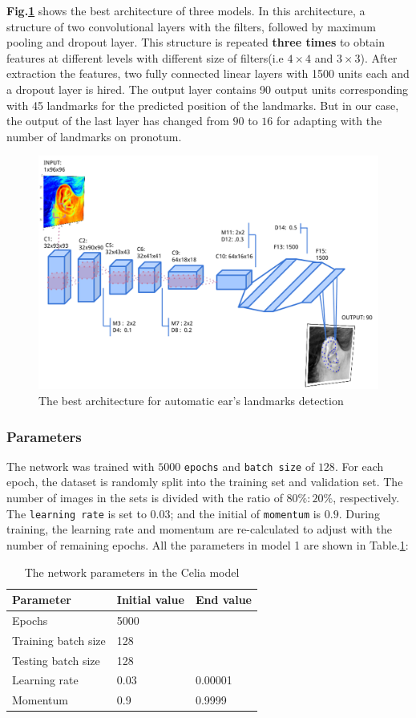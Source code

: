 \documentclass[12pt,a4paper]{article}
\begin{document}
\textbf{Fig.\ref{1Econv}} shows the best architecture of three models. In this architecture, a structure of two convolutional layers with the filters, followed by maximum pooling and dropout layer. This structure is repeated \textbf{three times} to obtain features at different levels with different size of filters(i.e $4 \times 4$ and $3 \times 3$). After extraction the features, two fully connected linear layers with 1500 units each and a dropout layer is hired. The output layer contains 90 output units corresponding with 45 landmarks for the predicted position of the landmarks. But in our case, the output of the last layer has changed from $90$ to $16$ for adapting with the number of landmarks on pronotum.
\begin{figure}[h!]
	\centering
	\includegraphics[scale=0.4]{images/ear_cnn}
	\caption{The best architecture for automatic ear's landmarks detection}
	\label{1Econv}
\end{figure}
\subsubsection{Parameters}
The network was trained with $5000$ \texttt{epochs} and \texttt{batch size} of $128$. For each epoch, the dataset is randomly split into the training set and validation set. The number of images in the sets is divided with the ratio of $80\%:20\%$, respectively. The \texttt{learning rate} is set to $0.03$; and the initial of \texttt{momentum} is $0.9$. During training, the learning rate and momentum are re-calculated to adjust with the number of remaining epochs. All the parameters in model 1 are shown in Table.\ref{celiaparameters}:
\begin{table}[h!]
	\centering
	\begin{tabular}{l l l}
	Parameter & Initial value & End value \\ \hline
	Epochs & 5000 &  \\ \hline
	Training batch size & 128 & \\ \hline
	Testing batch size & 128 & \\ \hline
	Learning rate & 0.03 & 0.00001 \\ \hline
	Momentum & 0.9 & 0.9999 \\ \hline
	\end{tabular}
	\caption{The network parameters in the Celia model}
	\label{celiaparameters}
\end{table}~\\
\end{document}
